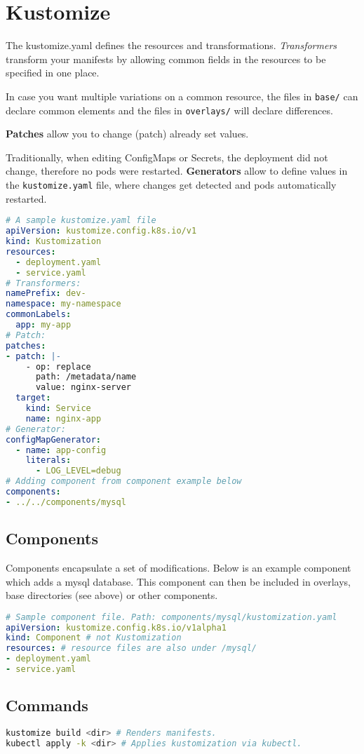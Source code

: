 \section{Kustomize}

The kustomize.yaml defines the resources and transformations. \textit{Transformers} transform your manifests by allowing common fields in the resources to be specified in one place.

In case you want multiple variations on a common resource, the files in \texttt{base/} can declare common elements and the files in \texttt{overlays/} will declare differences.

\textbf{Patches} allow you to change (patch) already set values.

Traditionally, when editing ConfigMaps or Secrets, the deployment did not change, therefore no pods were restarted. \textbf{Generators} allow to define values in the \texttt{kustomize.yaml} file, where changes get detected and pods automatically restarted.
\begin{lstlisting}[language=yaml]
# A sample kustomize.yaml file
apiVersion: kustomize.config.k8s.io/v1
kind: Kustomization
resources:
  - deployment.yaml
  - service.yaml
# Transformers:
namePrefix: dev-
namespace: my-namespace
commonLabels:
  app: my-app
# Patch:
patches:
- patch: |-
    - op: replace
      path: /metadata/name
      value: nginx-server
  target:
    kind: Service
    name: nginx-app
# Generator:
configMapGenerator:
  - name: app-config
    literals:
      - LOG_LEVEL=debug
# Adding component from component example below
components:
- ../../components/mysql
\end{lstlisting}

\subsection{Components}

Components encapsulate a set of modifications. Below is an example component which adds a mysql database. This component can then be included in overlays, base directories (see above) or other components.

\begin{lstlisting}[language=yaml]
# Sample component file. Path: components/mysql/kustomization.yaml
apiVersion: kustomize.config.k8s.io/v1alpha1
kind: Component # not Kustomization
resources: # resource files are also under /mysql/
- deployment.yaml
- service.yaml
\end{lstlisting}

\subsection{Commands}

\begin{lstlisting}[language=sh]
kustomize build <dir> # Renders manifests.
kubectl apply -k <dir> # Applies kustomization via kubectl.
\end{lstlisting}
